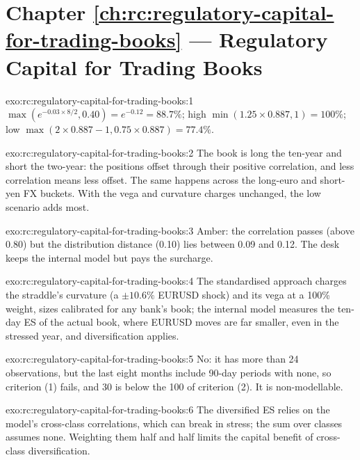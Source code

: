 \section*{Chapter \ref{ch:rc:regulatory-capital-for-trading-books} --- Regulatory Capital for Trading Books}

\begin{solution}{exo:rc:regulatory-capital-for-trading-books:1}
$\max(e^{-0.03\times8/2},0.40) = e^{-0.12} = 88.7\%$; high $\min(1.25\times0.887,1) = 100\%$; low
$\max(2\times0.887-1,0.75\times0.887) = 77.4\%$.
\end{solution}

\begin{solution}{exo:rc:regulatory-capital-for-trading-books:2}
The book is long the ten-year and short the two-year: the positions offset through their positive
correlation, and less correlation means less offset. The same happens across the long-euro and
short-yen FX buckets. With the vega and curvature charges unchanged, the low scenario adds most.
\end{solution}

\begin{solution}{exo:rc:regulatory-capital-for-trading-books:3}
Amber: the correlation passes (above 0.80) but the distribution distance (0.10) lies between 0.09 and
0.12. The desk keeps the internal model but pays the surcharge.
\end{solution}

\begin{solution}{exo:rc:regulatory-capital-for-trading-books:4}
The standardised approach charges the straddle's curvature (a $\pm10.6\%$ EURUSD shock) and its vega at a
100\% weight, sizes calibrated for any bank's book; the internal model measures the ten-day ES of the
actual book, where EURUSD moves are far smaller, even in the stressed year, and diversification
applies.
\end{solution}

\begin{solution}{exo:rc:regulatory-capital-for-trading-books:5}
No: it has more than 24 observations, but the last eight months include 90-day periods with none, so
criterion (1) fails, and 30 is below the 100 of criterion (2). It is non-modellable.
\end{solution}

\begin{solution}{exo:rc:regulatory-capital-for-trading-books:6}
The diversified ES relies on the model's cross-class correlations, which can break in stress; the sum
over classes assumes none. Weighting them half and half limits the capital benefit of
cross-class diversification.
\end{solution}

